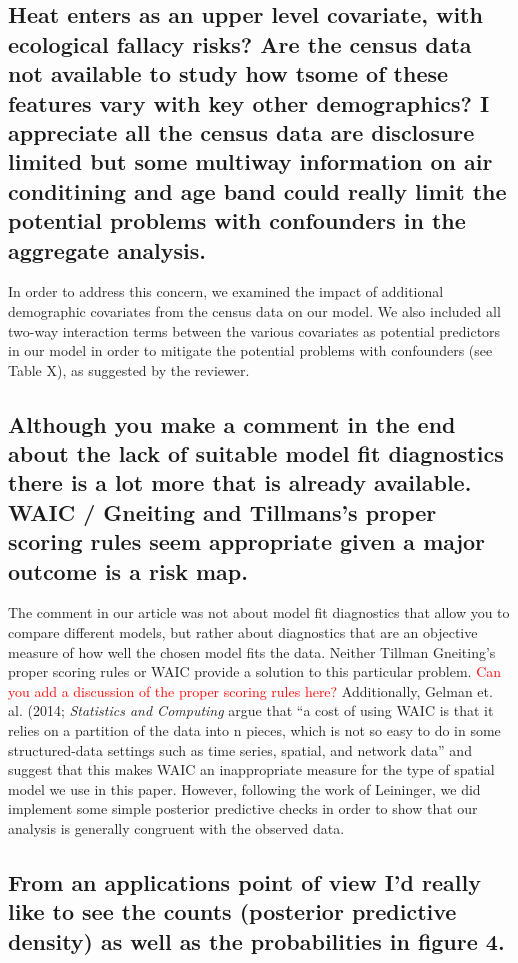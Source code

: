 \documentclass{article}
\begin{document}
\subsection{Heat enters as an upper level covariate, with ecological fallacy risks?   Are the census data not available to study how tsome of these features vary with key other demographics?   I appreciate all the census data are disclosure limited but some multiway information on air conditining and age band could really limit the potential problems with confounders in the aggregate analysis.}

In order to address this concern, we examined the impact of additional demographic covariates from the census data on our model. We also included all two-way interaction terms between the various covariates as potential predictors in our model in order to mitigate the potential problems with confounders (see Table X), as suggested by the reviewer. 

\subsection{Although you make a comment in the end about the lack of suitable model fit diagnostics there is a lot more that is already available.   WAIC / Gneiting and Tillmans's proper scoring rules seem appropriate given a major outcome is a risk map.}

The comment in our article was not about model fit diagnostics that allow you to compare different models, but rather about diagnostics that are an objective measure of how well the chosen model fits the data. Neither Tillman Gneiting's proper scoring rules or WAIC provide a solution to this particular problem. \textcolor{red}{Can you add a discussion of the proper scoring rules here?} Additionally, Gelman et. al. (2014; \textit{Statistics and Computing} argue that ``a cost of using WAIC is that it relies on a partition of the data into n pieces, which is not so easy to do in some structured-data settings such as time series, spatial, and network data'' and suggest that this makes WAIC an inappropriate measure for the type of spatial model we use in this paper. However, following the work of Leininger, we did implement some simple posterior predictive checks in order to show that our analysis is generally congruent with the observed data. 

\subsection{From an applications point of view I'd really like to see the counts (posterior predictive density) as well as the probabilities in figure 4.}
\end{document}
